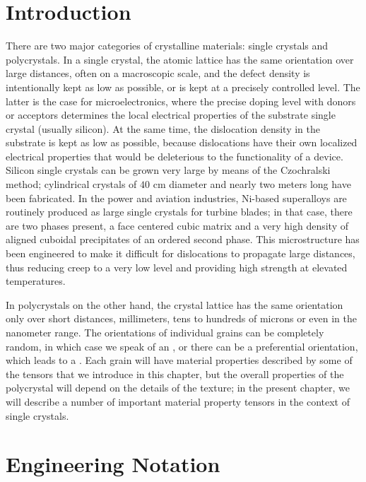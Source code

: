 \section{Introduction}\label{\chabbr:sec:matpropIntroduction}
There are two major categories of crystalline materials: single crystals and polycrystals. In a single crystal, the atomic lattice has the same orientation over large distances, often on a macroscopic scale, and the defect density is intentionally kept as low as possible, or is kept at a precisely controlled level.  The latter is the case for microelectronics, where the precise doping level with donors or acceptors determines the local electrical properties of the substrate single crystal (usually silicon). At the same time, the dislocation density in the substrate is kept as low as possible, because dislocations have their own localized electrical properties that would be deleterious to the functionality of a device.  Silicon single crystals can be grown very large by means of the Czochralski method; cylindrical crystals of $40$ cm diameter and nearly two meters long have been fabricated.  In the power and aviation industries, Ni-based superalloys are routinely produced as large single crystals for turbine blades; in that case, there are two phases present, a face centered cubic matrix and a very high density of aligned cuboidal precipitates of an ordered second phase.  This microstructure has been engineered to make it difficult for dislocations to propagate large distances, thus reducing creep to a very low level and providing high strength at elevated temperatures.  

In polycrystals on the other hand, the crystal lattice has the same orientation only over short distances, millimeters,  tens to hundreds of microns or even in the nanometer range. The orientations of individual grains can be completely random, in which case we speak of an , or there can be a preferential orientation, which leads to a .  Each grain will have material properties described by some of the tensors that we introduce in this chapter, but the overall properties of the polycrystal will depend on the details of the texture; in the present chapter, we will describe a number of important material property tensors in the context of single crystals.

\section{Engineering Notation}\label{\chabbr:sec:engineering} 

